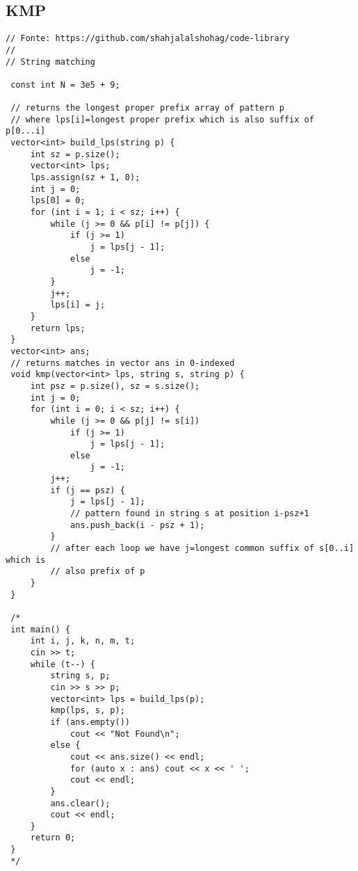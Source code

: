 \documentclass[11pt, a4paper, twoside]{article}
\begin{document}
\subsection{KMP}
\begin{lstlisting}
// Fonte: https://github.com/shahjalalshohag/code-library
//
// String matching

 const int N = 3e5 + 9;
 
 // returns the longest proper prefix array of pattern p
 // where lps[i]=longest proper prefix which is also suffix of p[0...i]
 vector<int> build_lps(string p) {
     int sz = p.size();
     vector<int> lps;
     lps.assign(sz + 1, 0);
     int j = 0;
     lps[0] = 0;
     for (int i = 1; i < sz; i++) {
         while (j >= 0 && p[i] != p[j]) {
             if (j >= 1)
                 j = lps[j - 1];
             else
                 j = -1;
         }
         j++;
         lps[i] = j;
     }
     return lps;
 }
 vector<int> ans;
 // returns matches in vector ans in 0-indexed
 void kmp(vector<int> lps, string s, string p) {
     int psz = p.size(), sz = s.size();
     int j = 0;
     for (int i = 0; i < sz; i++) {
         while (j >= 0 && p[j] != s[i])
             if (j >= 1)
                 j = lps[j - 1];
             else
                 j = -1;
         j++;
         if (j == psz) {
             j = lps[j - 1];
             // pattern found in string s at position i-psz+1
             ans.push_back(i - psz + 1);
         }
         // after each loop we have j=longest common suffix of s[0..i] which is
         // also prefix of p
     }
 }
 
 /*
 int main() {
     int i, j, k, n, m, t;
     cin >> t;
     while (t--) {
         string s, p;
         cin >> s >> p;
         vector<int> lps = build_lps(p);
         kmp(lps, s, p);
         if (ans.empty())
             cout << "Not Found\n";
         else {
             cout << ans.size() << endl;
             for (auto x : ans) cout << x << ' ';
             cout << endl;
         }
         ans.clear();
         cout << endl;
     }
     return 0;
 }
 */
\end{lstlisting}
\end{document}

